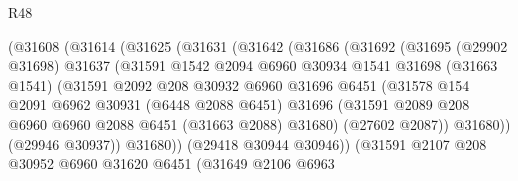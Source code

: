 \begin{lexlean}{R48}
\begin{coremodule}
                      (@31608
                        (@31614
                          (@31625
                            (@31631
                              (@31642
                                (@31686
                                  (@31692
                                    (@31695
                                      (@29902 @31698)
                                      @31637
                                      (@31591
                                        @1542
                                        @2094
                                        @6960
                                        @30934
                                        @1541
                                        @31698
                                        (@31663 @1541)
                                        (@31591
                                          @2092
                                          @208
                                          @30932
                                          @6960
                                          @31696
                                          @6451
                                          (@31578
                                            @154
                                            @2091
                                            @6962
                                            @30931
                                            (@6448 @2088 @6451)
                                            @31696
                                            (@31591
                                              @2089
                                              @208
                                              @6960
                                              @6960
                                              @2088
                                              @6451
                                              (@31663 @2088)
                                              @31680)
                                            (@27602 @2087))
                                          @31680))
                                      (@29946 @30937))
                                    @31680))
                                (@29418 @30944 @30946))
                              (@31591
                                @2107
                                @208
                                @30952
                                @6960
                                @31620
                                @6451
                                (@31649
                                  @2106
                                  @6963

\end{coremodule}
\end{lexlean}
